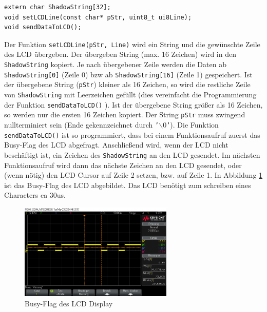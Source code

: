 \begin{lstlisting}[frame=htrbl, caption={Funktionsprototypen für Schattenspeicher Funktionalität}, label={lst:writedatatolcd}]
extern char ShadowString[32]; 
void setLCDLine(const char* pStr, uint8_t ui8Line);
void sendDataToLCD();
\end{lstlisting}
Der Funktion \texttt{setLCDLine(pStr, Line)} wird ein String und die gewünschte Zeile des LCD übergeben. Der übergeben String (max. 16 Zeichen) wird in den \texttt{ShadowString} kopiert. Je nach übergebener Zeile werden die Daten ab \texttt{ShadowString[0]} (Zeile 0) bzw ab \texttt{ShadowString[16]} (Zeile 1) gespeichert.\newline
Ist der übergebene String (\texttt{pStr}) kleiner als 16 Zeichen, so wird die restliche Zeile von \texttt{ShadowString} mit Leerzeichen gefüllt (dies vereinfacht die Programmierung der Funktion \texttt{sendDataToLCD()} ). Ist der übergebene String größer als 16 Zeichen, so werden nur die ersten 16 Zeichen kopiert. \newline
Der String \texttt{pStr} muss zwingend nullterminiert sein (Ende gekennzeichnet durch \texttt{'$\ensuremath{\backslash}0$'}). \newline
Die Funktion \texttt{sendDataToLCD()} ist so programmiert, dass bei einem Funktionsaufruf zuerst das Busy-Flag des LCD abgefragt. Anschließend wird, wenn der LCD nicht beschäftigt ist, ein Zeichen des \texttt{ShadowString} an den LCD gesendet. Im nächsten Funktionsaufruf wird dann das nächste Zeichen an den LCD gesendet, oder (wenn nötig) den LCD Cursor auf Zeile 2 setzen, bzw. auf Zeile 1.\newline
\newline
In Abbildung \ref{image:LCD_busy_flag} ist das Busy-Flag des LCD abgebildet. Das LCD benötigt zum schreiben eines Characters ca 30us.
\begin{figure}[!h]
	\centering
	\includegraphics[width=0.65\textwidth]{Images/LCD_busy_flag}
	\caption[NonBlockingCode]{Busy-Flag des LCD Display}
	\label{image:LCD_busy_flag}
\end{figure}


